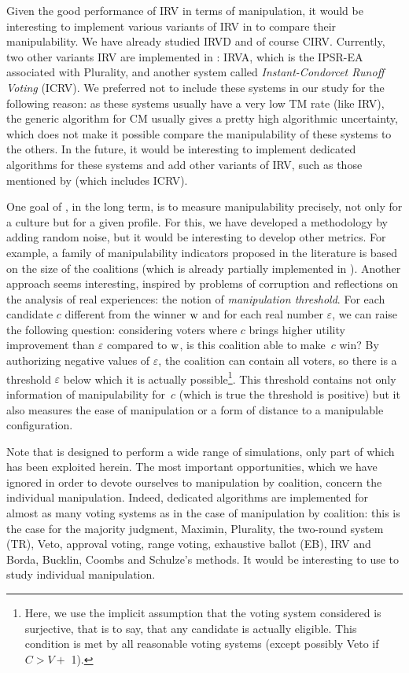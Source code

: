 Given the good performance of IRV in terms of manipulation, it would be interesting to implement various variants of IRV in \svvamp{} to compare their manipulability. We have already studied IRVD and of course CIRV. Currently, two other variants IRV are implemented in \svvamp{}: IRVA, which is the IPSR-EA associated with Plurality, and another system called \emph{Instant-Condorcet Runoff Voting} (ICRV). We preferred not to include these systems in our study for the following reason: as these systems usually have a very low TM rate (like IRV), the generic algorithm for CM usually gives a pretty high algorithmic uncertainty, which does not make it possible compare the manipulability of these systems to the others. In the future, it would be interesting to implement dedicated algorithms for these systems and add other variants of IRV, such as those mentioned by \cite{green2011four} (which includes ICRV).

One goal of \svvamp{}, in the long term, is to measure manipulability precisely, not only for a culture but for a given profile. For this, we have developed a methodology by adding random noise, but it would be interesting to develop other metrics. For example, a family of manipulability indicators proposed in the literature is based on the size of the coalitions (which is already partially implemented in \svvamp{}). Another approach seems interesting, inspired by problems of corruption and reflections on the analysis of real experiences: the notion of \emph{manipulation threshold}. For each candidate $ c $ different from the winner $\mathrm{w}$ and for each real number $\varepsilon$, we can raise the following question: considering voters where $ c $ brings higher utility improvement than $ \varepsilon $ compared to $ \mathrm{w} $, is this coalition able to make~$ c $ win? By authorizing negative values of $ \varepsilon $, the coalition can contain all voters, so there is a threshold $ \varepsilon $ below which it is actually possible\footnote{Here, we use the implicit assumption that the voting system considered is surjective, that is to say, that any candidate is actually eligible. This condition is met by all reasonable voting systems (except possibly Veto if $ C> V + $ 1).}. This threshold contains not only information of manipulability for~$ c $ (which is true \ssi the threshold is positive) but it also measures the ease of manipulation or a form of distance to a manipulable configuration.

Note that \svvamp{} is designed to perform a wide range of simulations, only part of which has been exploited herein. The most important opportunities, which we have ignored in order to devote ourselves to manipulation by coalition, concern the individual manipulation. Indeed, dedicated algorithms are implemented for almost as many voting systems as in the case of manipulation by coalition: this is the case for the majority judgment, Maximin, Plurality, the two-round system (TR), Veto, approval voting, range voting, exhaustive ballot (EB), IRV and Borda, Bucklin, Coombs and Schulze's methods. It would be interesting to use \svvamp{} to study individual manipulation.

